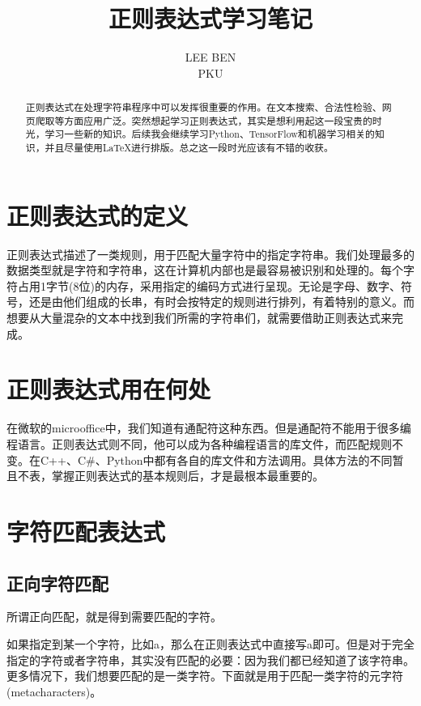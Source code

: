 \documentclass[a4papaer,utf8,12pt,draft,titlepage]{ctexart}
\begin{document}
		\title{正则表达式学习笔记}
		\author{LEE BEN\\PKU}
		\maketitle
		\renewcommand{\abstractname}{序言}
		\begin{abstract}
			正则表达式在处理字符串程序中可以发挥很重要的作用。在文本搜索、合法性检验、网页爬取等方面应用广泛。突然想起学习正则表达式，其实是想利用起这一段宝贵的时光，学习一些新的知识。后续我会继续学习Python、TensorFlow和机器学习相关的知识，并且尽量使用LaTeX进行排版。总之这一段时光应该有不错的收获。
		\end{abstract}
	
	\tableofcontents
	\newpage
		\section{正则表达式的定义}
		正则表达式描述了一类规则，用于匹配大量字符中的指定字符串。我们处理最多的数据类型就是字符和字符串，这在计算机内部也是最容易被识别和处理的。每个字符占用1字节(8位)的内存，采用指定的编码方式进行呈现。无论是字母、数字、符号，还是由他们组成的长串，有时会按特定的规则进行排列，有着特别的意义。而想要从大量混杂的文本中找到我们所需的字符串们，就需要借助正则表达式来完成。
		\section{正则表达式用在何处}
		在微软的microoffice中，我们知道有通配符这种东西。但是通配符不能用于很多编程语言。正则表达式则不同，他可以成为各种编程语言的库文件，而匹配规则不变。在C++、C\#、Python中都有各自的库文件和方法调用。具体方法的不同暂且不表，掌握正则表达式的基本规则后，才是最根本最重要的。
		\section{字符匹配表达式}
			\subsection{正向字符匹配}
			所谓正向匹配，就是得到需要匹配的字符。
			
			如果指定到某一个字符，比如a，那么在正则表达式中直接写a即可。但是对于完全指定的字符或者字符串，其实没有匹配的必要：因为我们都已经知道了该字符串。更多情况下，我们想要匹配的是一类字符。下面就是用于匹配一类字符的元字符(metacharacters)。
			
\end{document}
